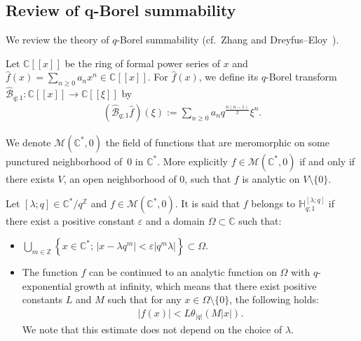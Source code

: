 \documentclass[pdftex]{sigma}
\numberwithin{equation}{section}
\begin{document}
\subsection[Review of $q$-Borel summability]{Review of $\boldsymbol{q}$-Borel summability}\label{Review}
We review the theory of $q$-Borel summability (cf.~Zhang \cite{Zhang2002, Zhang2005} and Dreyfus--Eloy~\cite{DreyfusEloy2016}).

Let $\mathbb{C}[[x]]$ be the ring of formal power series of $x$ and $\hat{f}(x)=\sum\limits_{n\ge0}a_nx^n\in\mathbb{C}[[x]]$. For $\hat{f}(x)$, we define its $q$-Borel transform $\hat{\mathcal{B}}_{q;1}\colon \mathbb{C}[[x]]\to\mathbb{C}[[\xi]]$ by
\begin{gather*}
(\hat{\mathcal{B}}_{q;1}\hat{f})(\xi):=\sum_{n\ge0}a_nq^{\frac{n(n-1)}{2}}\xi^n.
\end{gather*}

We denote $\mathcal{M}(\mathbb{C}^*,0)$ the field of functions that are meromorphic on some punctured neigh\-borhood of~0 in $\mathbb{C}^*$. More explicitly $f\in\mathcal{M}(\mathbb{C}^*,0)$ if and only if there exists $V$, an open neighborhood of 0, such that $f$ is analytic on $V\setminus\{0\}$.

Let $[\lambda;q]\in\mathbb{C}^*/q^\mathbb{Z}$ and $f\in\mathcal{M}(\mathbb{C}^*,0)$. It is said that $f$ belongs to $\mathbb{H}_{q;1}^{[\lambda;q]}$ if there exist a positive constant $\varepsilon$ and a domain $\Omega\subset\mathbb{C}$ such that:
\begin{itemize}\itemsep=0pt
\item $\displaystyle\bigcup_{m\in\mathbb{Z}}\left\{x\in\mathbb{C}^* ;\,\left|x-\lambda q^m\right|<\varepsilon\left|q^m\lambda\right|\right\}\subset\Omega$.
\item The function $f$ can be continued to an analytic function on $\Omega$ with $q$-exponential growth at infinity, which means that there exist positive constants $L$ and $M$ such that for any $x\in\Omega\setminus\{0\}$, the following holds:
\begin{gather*}
|f(x)|<L\theta_{|q|}(M|x|).
\end{gather*}
We note that this estimate does not depend on the choice of $\lambda$.
\end{itemize}
\end{document}
